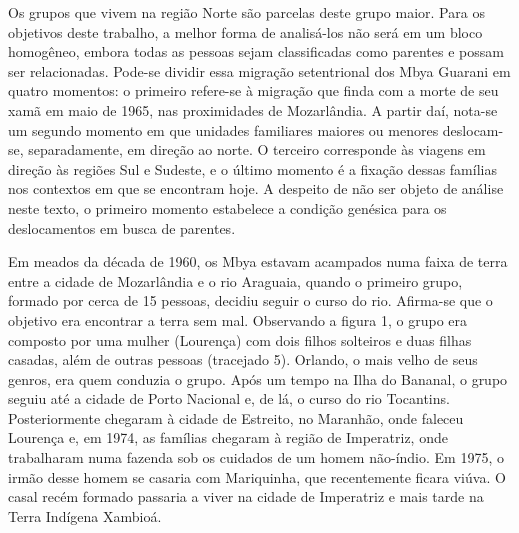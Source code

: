 Os grupos que vivem na região Norte são parcelas deste grupo maior. Para
os objetivos deste trabalho, a melhor forma de analisá-los não será em
um bloco homogêneo, embora todas as pessoas sejam classificadas como
parentes e possam ser relacionadas. Pode-se dividir essa migração
setentrional dos Mbya Guarani em quatro momentos: o primeiro refere-se à
migração que finda com a morte de seu xamã em maio de 1965, nas
proximidades de Mozarlândia. A partir daí, nota-se um segundo momento em
que unidades familiares maiores ou menores deslocam-se, separadamente,
em direção ao norte. O terceiro corresponde às viagens em direção às
regiões Sul e Sudeste, e o último momento é a fixação dessas famílias
nos contextos em que se encontram hoje. A despeito de não ser objeto de
análise neste texto, o primeiro momento estabelece a condição genésica
para os deslocamentos em busca de parentes.

Em meados da década de 1960, os Mbya estavam acampados numa faixa de
terra entre a cidade de Mozarlândia e o rio Araguaia, quando o primeiro
grupo, formado por cerca de 15 pessoas, decidiu seguir o curso do rio.
Afirma-se que o objetivo era encontrar a terra sem mal. Observando a
figura 1, o grupo era composto por uma mulher (Lourença) com dois filhos
solteiros e duas filhas casadas, além de outras pessoas (tracejado 5).
Orlando, o mais velho de seus genros, era quem conduzia o grupo. Após um
tempo na Ilha do Bananal, o grupo seguiu até a cidade de Porto Nacional
e, de lá, o curso do rio Tocantins. Posteriormente chegaram à cidade de
Estreito, no Maranhão, onde faleceu Lourença e, em 1974, as famílias
chegaram à região de Imperatriz, onde trabalharam numa fazenda sob os
cuidados de um homem não-índio. Em 1975, o irmão desse homem se casaria
com Mariquinha, que recentemente ficara viúva. O casal recém formado
passaria a viver na cidade de Imperatriz e mais tarde na Terra Indígena
Xambioá.

